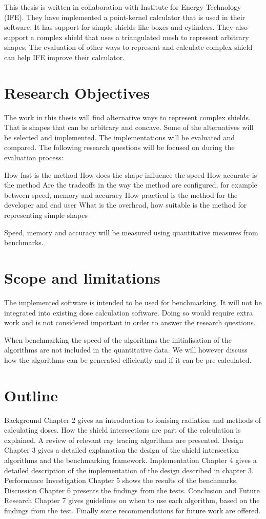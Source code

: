 \documentclass[11pt,twoside,a4paper]{report}
\begin{document}
This thesis is written in collaboration with Institute for Energy Technology (IFE). They have implemented a point-kernel calculator that is used in their software. It has support for simple shields like boxes and cylinders. They also support a complex shield that uses a triangulated mesh to represent arbitrary shapes. The evaluation of other ways to represent and calculate complex shield can help IFE improve their calculator.


\section{Research Objectives}
The work in this thesis will find alternative ways to represent complex shields. That is shapes that can be arbitrary and concave. Some of the alternatives will be selected and implemented. The implementations will be evaluated and compared. The following research questions will be focused on during the evaluation process:

How fast is the method
How does the shape influence the speed
How accurate is the method
Are the tradeoffs in the way the method are configured, for example between speed, memory and accuracy
How practical is the method for the developer and end user
What is the overhead, how suitable is the method for representing simple shapes

Speed, memory and accuracy will be measured using quantitative measures from benchmarks. 

\section{Scope and limitations}
The implemented software is intended to be used for benchmarking. It will not be integrated into existing dose calculation software. Doing so would require extra work and is not considered important in order to answer the research questions.

When benchmarking the speed of the algorithms the initialisation of the algorithms are not included in the quantitative data. We will however discuss how the algorithms can be generated efficiently and if it can be pre calculated.

\section{Outline}
Background
Chapter 2 gives an introduction to ionising radiation and methods of calculating doses. How the shield intersections are part of the calculation is explained.  A review of relevant ray tracing algorithms are presented. 
Design
Chapter 3 gives a detailed explanation the design of the shield intersection algorithms and the benchmarking framework. 
Implementation
Chapter 4 gives a detailed description of the implementation of the design described in chapter 3.
Performance Investigation
Chapter 5 shows the results of the benchmarks.
Discussion
Chapter 6 presents the findings from the tests.
Conclusion and Future Research
Chapter 7 gives guidelines on when to use each algorithm, based on the findings from the test. Finally some recommendations for future work are offered.
\end{document}
